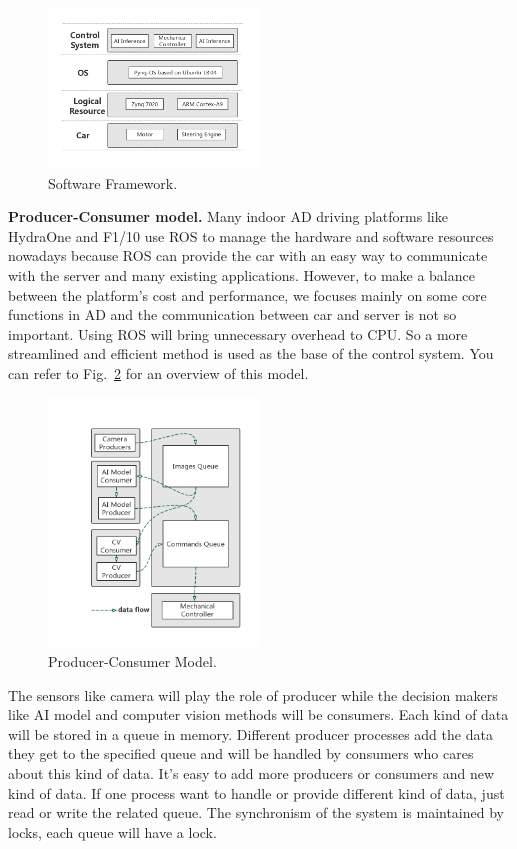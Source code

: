 \documentclass[conference]{IEEEtran}
\begin{document}
\begin{sloppypar}
\begin{figure}[htbp]
\centerline{\includegraphics[width=0.5\textwidth]{sf.jpg}}
\caption{Software Framework.}
\label{sf}
\end{figure}

\textbf{Producer-Consumer model.} Many indoor AD driving platforms like HydraOne\cite{b9} and F1/10\cite{b11} use ROS\cite{b19} to manage the hardware and software resources nowadays because ROS can provide the car with an easy way to communicate with the server and many existing applications. However, to make a balance between the platform's cost and performance, we focuses mainly on some core functions in AD and the communication between car and server is not so important. Using ROS will bring unnecessary overhead to CPU. So a more streamlined and efficient method is used as the base of the control system. You can refer to Fig.~\ref{pcm} for an overview of this model.


\begin{figure}[htbp]
\centerline{\includegraphics[width=0.5\textwidth]{pcm.jpg}}
\caption{Producer-Consumer Model.}
\label{pcm}
\end{figure}

The sensors like camera will play the role of producer while the decision makers like AI model and computer vision methods will be consumers. Each kind of data will be stored in a queue in memory. Different producer processes add the data they get to the specified queue and will be handled by consumers who cares about this kind of data. It's easy to add more producers or consumers and new kind of data. If one process want to handle or provide different kind of data, just read or write the related queue. The synchronism of the system is maintained by locks, each queue will have a lock.


\end{sloppypar}
\end{document}
